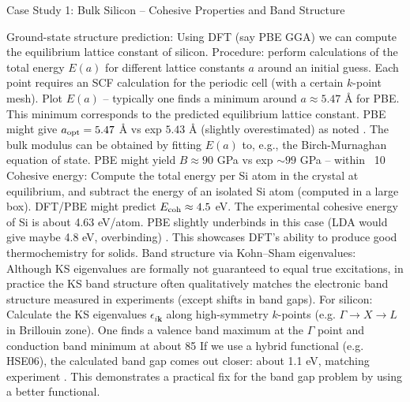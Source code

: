 \begin{frame}{Case Study 1: Bulk Silicon – Cohesive Properties and Band Structure}

Ground-state structure prediction: Using DFT (say PBE GGA) we can compute the equilibrium lattice constant of silicon. Procedure: perform calculations of the total energy $E(a)$ for different lattice constants $a$ around an initial guess. Each point requires an SCF calculation for the periodic cell (with a certain $k$-point mesh). Plot $E(a)$ – typically one finds a minimum around $a \approx 5.47$ Å for PBE. This minimum corresponds to the predicted equilibrium lattice constant. PBE might give $a_{\rm opt}=5.47$ Å vs exp $5.43$ Å (slightly overestimated) as noted . The bulk modulus can be obtained by fitting $E(a)$ to, e.g., the Birch-Murnaghan equation of state. PBE might yield $B \approx 90$ GPa vs exp $\sim99$ GPa – within ~10%
Cohesive energy: Compute the total energy per Si atom in the crystal at equilibrium, and subtract the energy of an isolated Si atom (computed in a large box). DFT/PBE might predict $E_{\rm coh} \approx 4.5$ eV. The experimental cohesive energy of Si is about 4.63 eV/atom. PBE slightly underbinds in this case (LDA would give maybe 4.8 eV, overbinding) . This showcases DFT’s ability to produce good thermochemistry for solids.
Band structure via Kohn–Sham eigenvalues: Although KS eigenvalues are formally not guaranteed to equal true excitations, in practice the KS band structure often qualitatively matches the electronic band structure measured in experiments (except shifts in band gaps). For silicon: 
Calculate the KS eigenvalues $\epsilon_{i\mathbf{k}}$ along high-symmetry $k$-points (e.g. $\Gamma \to X \to L$ in Brillouin zone). One finds a valence band maximum at the $\Gamma$ point and conduction band minimum at about 85%
If we use a hybrid functional (e.g. HSE06), the calculated band gap comes out closer: about 1.1 eV, matching experiment . This demonstrates a practical fix for the band gap problem by using a better functional.


\end{frame}
